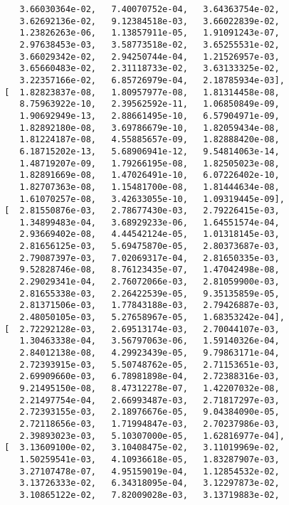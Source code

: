 \documentclass[11pt,a4j,fleqn]{jarticle}
\begin{document}
\begin{verbatim}
          3.66030364e-02,   7.40070752e-04,   3.64363754e-02,
          3.62692136e-02,   9.12384518e-03,   3.66022839e-02,
          1.23826263e-06,   1.13857911e-05,   1.91091243e-07,
          2.97638453e-03,   3.58773518e-02,   3.65255531e-02,
          3.66029342e-02,   2.94250744e-04,   1.21526957e-03,
          3.65660483e-02,   2.31118733e-02,   3.63133325e-02,
          3.22357166e-02,   6.85726979e-04,   2.18785934e-03],
       [  1.82823837e-08,   1.80957977e-08,   1.81314458e-08,
          8.75963922e-10,   2.39562592e-11,   1.06850849e-09,
          1.90692949e-13,   2.88661495e-10,   6.57904971e-09,
          1.82892180e-08,   3.69786679e-10,   1.82059434e-08,
          1.81224187e-08,   4.55885657e-09,   1.82888420e-08,
          6.18715202e-13,   5.68906941e-12,   9.54814063e-14,
          1.48719207e-09,   1.79266195e-08,   1.82505023e-08,
          1.82891669e-08,   1.47026491e-10,   6.07226402e-10,
          1.82707363e-08,   1.15481700e-08,   1.81444634e-08,
          1.61070257e-08,   3.42633055e-10,   1.09319445e-09],
       [  2.81550876e-03,   2.78677430e-03,   2.79226415e-03,
          1.34899483e-04,   3.68929233e-06,   1.64551574e-04,
          2.93669402e-08,   4.44542124e-05,   1.01318145e-03,
          2.81656125e-03,   5.69475870e-05,   2.80373687e-03,
          2.79087397e-03,   7.02069317e-04,   2.81650335e-03,
          9.52828746e-08,   8.76123435e-07,   1.47042498e-08,
          2.29029341e-04,   2.76072066e-03,   2.81059900e-03,
          2.81655338e-03,   2.26422539e-05,   9.35135859e-05,
          2.81371506e-03,   1.77843188e-03,   2.79426887e-03,
          2.48050105e-03,   5.27658967e-05,   1.68353242e-04],
       [  2.72292128e-03,   2.69513174e-03,   2.70044107e-03,
          1.30463338e-04,   3.56797063e-06,   1.59140326e-04,
          2.84012138e-08,   4.29923439e-05,   9.79863171e-04,
          2.72393915e-03,   5.50748762e-05,   2.71153651e-03,
          2.69909660e-03,   6.78981898e-04,   2.72388316e-03,
          9.21495150e-08,   8.47312278e-07,   1.42207032e-08,
          2.21497754e-04,   2.66993487e-03,   2.71817297e-03,
          2.72393155e-03,   2.18976676e-05,   9.04384090e-05,
          2.72118656e-03,   1.71994847e-03,   2.70237986e-03,
          2.39893023e-03,   5.10307000e-05,   1.62816977e-04],
       [  3.13609100e-02,   3.10408475e-02,   3.11019969e-02,
          1.50259541e-03,   4.10936618e-05,   1.83287907e-03,
          3.27107478e-07,   4.95159019e-04,   1.12854532e-02,
          3.13726333e-02,   6.34318095e-04,   3.12297873e-02,
          3.10865122e-02,   7.82009028e-03,   3.13719883e-02,

\end{verbatim}
\end{document}
